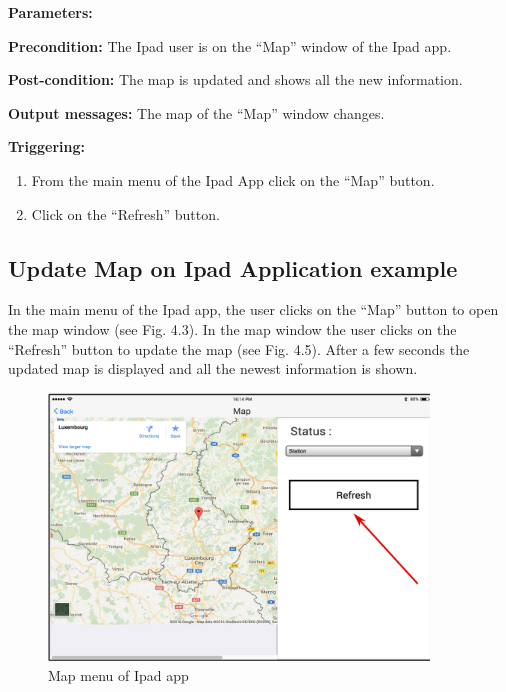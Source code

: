 \begin{description}

\item \textbf{Parameters:} 
\item \textbf{Precondition:} The Ipad user is on the “Map” window of
the Ipad app.
\item \textbf{Post-condition:} The map is updated and shows all the new
information.
\item \textbf{Output messages:} The map of the “Map” window changes.


\item \textbf{Triggering:}
\begin{enumerate}
  \item From the main menu of the Ipad App click on the “Map” button.
  \item Click on the “Refresh” button.
\end{enumerate}
 

\end{description}

 
\subsection{Update Map on Ipad Application example}
In the main menu of the Ipad app, the user clicks on the “Map” button to open
the map window (see Fig. 4.3). In the map window the user clicks on the
“Refresh” button to update the map (see Fig. 4.5). After a few seconds the updated map is
displayed and all the newest information is shown.

\begin{minipage}{1.0\textwidth}
\begin{figure}[H]
\caption{Map menu of Ipad app}
\includegraphics[width=0.9\textwidth]{UpdateMap.eps}
\end{figure}
\end{minipage}
